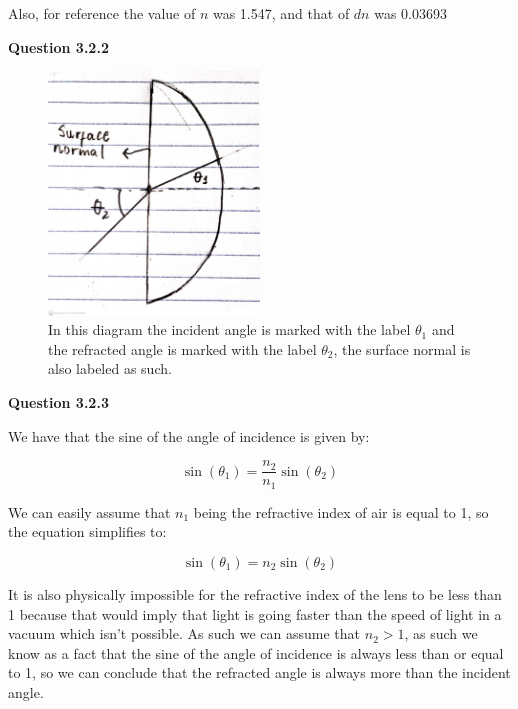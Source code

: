 \documentclass[a4paper,12pt]{article}
\begin{document}
\vspace{1cm}

\noindent Also, for reference the value of $n$ was 1.547, and that of $dn$ was 0.03693

\vspace{15cm}

\noindent \textbf{\LARGE Question 3.2.2}

\begin{figure}[htbp]
    \centering
    \includegraphics[width=0.5\textwidth]{second_diagram_lab1_PHY_192.jpg}
    \caption{In this diagram the incident angle is marked with the label $\theta_1$ and the refracted angle is marked with the label $\theta_2$, the surface normal is also labeled as such.} 
\end{figure}



\noindent \textbf{\LARGE Question 3.2.3}

\vspace{1cm}

We have that the sine of the angle of incidence is given by: 

\begin{equation}
    \sin(\theta_1) = \frac{n_2}{n_1} \sin(\theta_2)
\end{equation}

We can easily assume that $n_1$ being the refractive index of air is equal to 1, so the equation simplifies to:

\begin{equation}
    \sin(\theta_1) = n_2 \sin(\theta_2)
\end{equation}

It is also physically impossible for the refractive index of the lens to be less than 1 because that would imply that light is going faster than the speed of light in a vacuum which isn't possible. As such we can assume that $n_2 > 1$, as such we know as a fact that the sine of the angle of incidence is always less than or equal to 1, so we can conclude that the refracted angle is always more than the incident angle.
\end{document}
